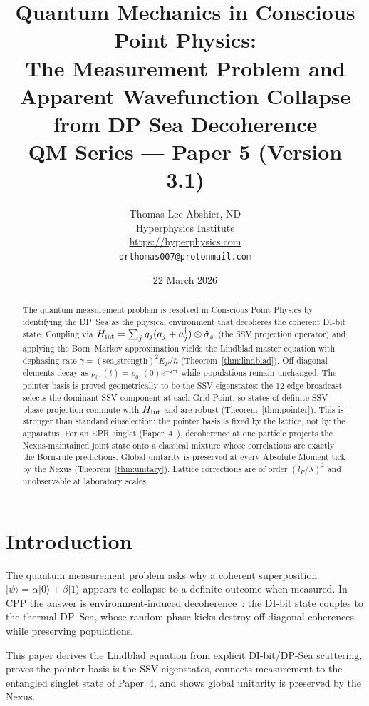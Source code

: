 \documentclass[11pt,a4paper]{article}
\title{\textbf{Quantum Mechanics in Conscious Point Physics:\\
The Measurement Problem and Apparent Wavefunction Collapse\\
from DP Sea Decoherence}\\[6pt]
{\large QM Series --- Paper 5 (Version 3.1)}}
\author{Thomas Lee Abshier, ND\\
Hyperphysics Institute\\
\url{https://hyperphysics.com}\\
\texttt{drthomas007@protonmail.com}}
\date{22 March 2026}
\newcommand{\lP}{l_P}
\newcommand{\EP}{E_P}
\newcommand{\ket}[1]{|#1\rangle}
\begin{document}
\maketitle

\begin{abstract}
The quantum measurement problem is resolved in Conscious Point Physics
by identifying the DP~Sea as the physical environment that decoheres
the coherent DI-bit state.  Coupling via
$H_{\rm int} = \sum_j g_j(a_j+a_j^\dagger)\otimes\hat{\sigma}_z$
(the SSV projection operator) and applying the Born--Markov
approximation yields the Lindblad master equation with dephasing rate
$\gamma = (\text{sea\_strength})^2\EP/\hbar$
(Theorem~\ref{thm:lindblad}).  Off-diagonal elements decay as
$\rho_{01}(t) = \rho_{01}(0)e^{-2\gamma t}$ while populations
remain unchanged.  The pointer basis is proved geometrically to be the
SSV eigenstates: the 12-edge broadcast selects the dominant SSV
component at each Grid Point, so states of definite SSV phase
projection commute with $H_{\rm int}$ and are robust
(Theorem~\ref{thm:pointer}).  This is stronger than standard
einselection: the pointer basis is fixed by the lattice, not by the
apparatus.  For an EPR singlet (Paper~4~\cite{cpp2040c}), decoherence
at one particle projects the Nexus-maintained joint state onto a
classical mixture whose correlations are exactly the Born-rule
predictions.  Global unitarity is preserved at every Absolute Moment
tick by the Nexus (Theorem~\ref{thm:unitary}).  Lattice corrections are
of order $(\lP/\lambda)^2$ and unobservable at laboratory scales.
\end{abstract}

\tableofcontents
\newpage

\section{Introduction}

The quantum measurement problem asks why a coherent superposition
$\ket{\psi} = \alpha\ket{0}+\beta\ket{1}$ appears to collapse to a
definite outcome when measured.  In CPP the answer is
environment-induced decoherence~\cite{zeh1970,zurek1981}: the DI-bit
state couples to the thermal DP~Sea, whose random phase kicks destroy
off-diagonal coherences while preserving populations.

This paper derives the Lindblad equation from explicit DI-bit/DP-Sea
scattering, proves the pointer basis is the SSV eigenstates, connects
measurement to the entangled singlet state of Paper~4, and shows
global unitarity is preserved by the Nexus.
\end{document}
